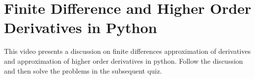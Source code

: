 
\section{Finite Difference and Higher Order Derivatives in Python}
\videolesson
\begin{selfvideo}[1]
This video presents a discussion on finite differences approximation of derivatives and approximation of higher order derivatives in python. Follow the discussion and then solve the problems in the subsequent quiz.
\end{selfvideo}
%
%
%
